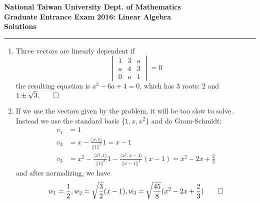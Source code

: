 \begin{center}
    \textbf{National Taiwan University Dept. of Mathematics \\ Graduate Entrance Exam 2016: Linear Algebra \\ Solutions} 
    \noindent\rule{\textwidth}{0.4pt}
\end{center}

\begin{enumerate}
    \item Three vectors are linearly dependent if
    \[
    \begin{vmatrix}
        1 & 3 & a \\
        a & 4 & 3 \\
        0 & a & 1
    \end{vmatrix} = 0
    \]
    the resulting equation is $a^3 - 6a + 4 = 0$, which has 3 roots: $2$ and $1 \pm \sqrt{3}. \qed$
    \item If we use the vectors given by the problem, it will be too slow to solve. Instead we use the standard basis $\{1, x, x^2\}$ and do Gram-Schmidt:
    \begin{align*}
    v_1 &= 1	\\
    v_2 &= x - \frac{\langle x, 1\rangle}{||1||^2} 1 = x-1 \\
    v_3 &= x^2 - \frac{\langle x^2, 1\rangle}{||1||^2} 1 - \frac{\langle x^2, x-1\rangle}{||x-1||^2} (x-1) = x^2 - 2x + \frac{2}{3}
    \end{align*}
    and after normalizing, we have
    \[
    w_1 = \frac{1}{2}, w_2 = \sqrt{\frac{3}{2}}(x-1), w_3 = \sqrt{\frac{45}{8}}(x^2 - 2x + \frac{2}{3}) \qed
    \]


\end{enumerate}
